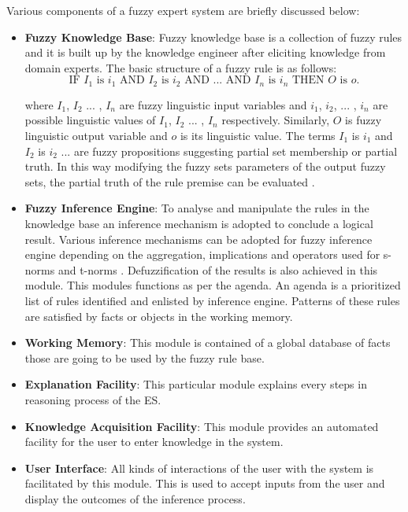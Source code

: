 \documentclass{elsarticle}
\begin{document}
Various components of a fuzzy expert system are briefly discussed below:
\begin{itemize}

\item \textbf{Fuzzy Knowledge Base}: Fuzzy knowledge base is a collection of fuzzy rules and it is built up by the knowledge engineer after eliciting knowledge from domain experts. The basic structure of a fuzzy rule is as follows:
\begin{equation*}
\text{IF } I_1 \text{ is } i_1 \text{ AND } I_2 \text{ is } i_2 \text{ AND ... AND } I_n \text{ is } i_n \text{ THEN } O \text{ is }o. 
\end{equation*}

where $I_1$, $I_2$ ... , $I_n$ are fuzzy linguistic input variables and $i_1$, $i_2$, ... , $i_n$ are possible linguistic values of $I_1$, $I_2$ ... , $I_n$ respectively. Similarly, $O$ is fuzzy linguistic output variable and $o$ is its linguistic value. The terms $I_1$ is $i_1$ and $I_2$ is $i_2$ ... are fuzzy propositions suggesting  partial  set  membership  or  partial  truth. In this way modifying the fuzzy sets parameters of the output fuzzy sets, the  partial  truth  of  the  rule premise can be evaluated \cite{matthews2003formal}.

\item \textbf{Fuzzy Inference Engine}: To  analyse  and manipulate  the  rules  in  the  knowledge  base an inference mechanism is adopted to conclude a logical result. Various inference mechanisms  can  be  adopted  for  fuzzy  inference  engine  depending on  the  aggregation, implications and operators used for s-norms and t-norms \cite{wang1999course}. Defuzzification of the results is also achieved  in this module. This modules functions as per the agenda. An agenda is a prioritized list of rules identified and enlisted by inference engine. Patterns of these rules are satisfied by facts or objects in the working memory. 

\item \textbf{Working Memory}: This module is contained of a global database of facts those are going to be used by the fuzzy rule base.

\item \textbf{Explanation Facility}: This particular module explains every steps in reasoning process of the ES.

\item \textbf{Knowledge Acquisition Facility}: This module provides an automated facility for the user to enter knowledge in the system.

\item \textbf{User Interface}: All kinds of interactions of the user with the system is facilitated by this module. This is used to accept inputs from the user and display the outcomes of the inference process.
\end{itemize}
\end{document}
